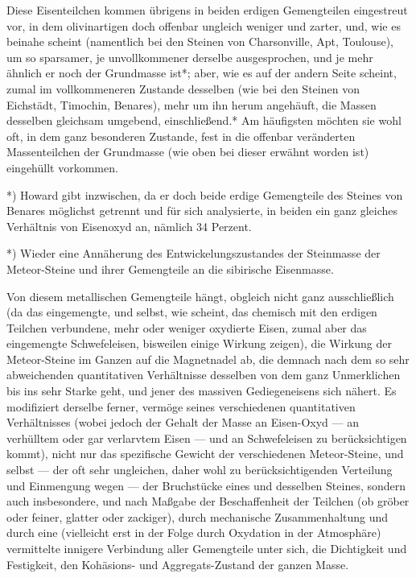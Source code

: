\documentclass[a4paper, 11pt, oneside, german]{article}
\begin{document}
Diese Eisenteilchen kommen übrigens in beiden erdigen Gemengteilen eingestreut vor, in dem olivinartigen doch offenbar ungleich weniger und zarter, und, wie es beinahe scheint (namentlich bei den Steinen von Charsonville, Apt, Toulouse), um so sparsamer, je unvollkommener derselbe ausgesprochen, und je mehr ähnlich er noch der Grundmasse ist*; aber, wie es auf der andern Seite scheint, zumal im vollkommeneren Zustande desselben (wie bei den Steinen von Eichstädt, Timochin, Benares), mehr um ihn herum angehäuft, die Massen desselben gleichsam umgebend, einschließend.* Am häufigsten möchten sie wohl oft, in dem ganz besonderen Zustande, fest in die offenbar veränderten Massenteilchen der Grundmasse (wie oben bei dieser erwähnt worden ist) eingehüllt vorkommen.

*) Howard gibt inzwischen, da er doch beide erdige Gemengteile des Steines von Benares möglichst getrennt und für sich analysierte, in beiden ein ganz gleiches Verhältnis von Eisenoxyd an, nämlich 34 Perzent.

*) Wieder eine Annäherung des Entwickelungszustandes der Steinmasse der Meteor-Steine und ihrer Gemengteile an die sibirische Eisenmasse.

Von diesem metallischen Gemengteile hängt, obgleich nicht ganz ausschließlich (da das eingemengte, und selbst, wie scheint, das chemisch mit den erdigen Teilchen verbundene, mehr oder weniger oxydierte Eisen, zumal aber das eingemengte Schwefeleisen, bisweilen einige Wirkung zeigen), die Wirkung der Meteor-Steine im Ganzen auf die Magnetnadel ab, die demnach nach dem so sehr abweichenden quantitativen Verhältnisse desselben von dem ganz Unmerklichen bis ins sehr Starke geht, und jener des massiven Gediegeneisens sich nähert. Es modifiziert derselbe ferner, vermöge seines verschiedenen quantitativen Verhältnisses (wobei jedoch der Gehalt der Masse an Eisen-Oxyd --- an verhülltem oder gar verlarvtem Eisen --- und an Schwefeleisen zu berücksichtigen kommt), nicht nur das spezifische Gewicht der verschiedenen Meteor-Steine, und selbst --- der oft sehr ungleichen, daher wohl zu berücksichtigenden Verteilung und Einmengung wegen --- der Bruchstücke eines und desselben Steines, sondern auch insbesondere, und nach Maßgabe der Beschaffenheit der Teilchen (ob gröber oder feiner, glatter oder zackiger), durch mechanische Zusammenhaltung und durch eine (vielleicht erst in der Folge durch Oxydation in der Atmosphäre) vermittelte innigere Verbindung aller Gemengteile unter sich, die Dichtigkeit und Festigkeit, den Kohäsions- und Aggregats-Zustand der ganzen Masse.
\end{document}
